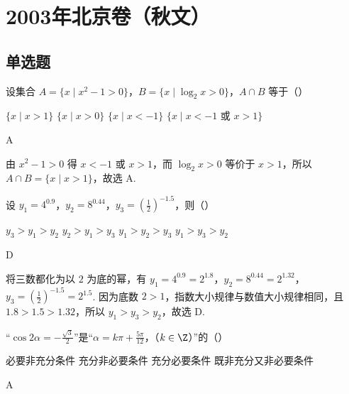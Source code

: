 \chapter{2003年北京卷（秋文）}
\section{单选题}
\begin{problem}
设集合 \(A = \{x \mid x^2 - 1 > 0\}\)，\(B = \{x \mid \log_2 x > 0\}\)，\(A \cap B\) 等于（\quad）

\choices
    {\(\{x \mid x > 1\}\)}
    {\(\{x \mid x > 0\}\)}
    {\(\{x \mid x < -1\}\)}
    {\(\{x \mid x < -1 \text{\ 或\ } x > 1\}\)}
\end{problem}

\begin{answer}
A
\end{answer}

\begin{solution}
由 \(x^2-1>0\) 得 \(x<-1\) 或 \(x>1\)，而 \(\log_2x>0\) 等价于 \(x>1\)，所以 \(A\cap B=\{x\mid x>1\}\)，故选 A.
\end{solution}

\begin{problem}
设 \(y_1 = 4^{0.9}\)，\(y_2 = 8^{0.44}\)，\(y_3 = \left(\frac{1}{2}\right)^{-1.5}\)，则（\quad）

\choices
    {\(y_3 > y_1 > y_2\)}
    {\(y_2 > y_1 > y_3\)}
    {\(y_1 > y_2 > y_3\)}
    {\(y_1 > y_3 > y_2\)}
\end{problem}

\begin{answer}
D
\end{answer}

\begin{solution}
将三数都化为以 \(2\) 为底的幂，有 \(y_1=4^{0.9}=2^{1.8}\)，\(y_2=8^{0.44}=2^{1.32}\)，\(y_3=(\frac{1}{2})^{-1.5}=2^{1.5}\). 因为底数 \(2>1\)，指数大小规律与数值大小规律相同，且 \(1.8>1.5>1.32\)，所以 \(y_1>y_3>y_2\)，故选 D.
\end{solution}

\begin{problem}
“\(\cos 2\alpha = -\frac{\sqrt{3}}{2}\)”是“\(\alpha = k\pi + \frac{5\pi}{12}\)，（\(k \in \Z\)）”的（\quad）

\choices
    {必要非充分条件}
    {充分非必要条件}
    {充分必要条件}
    {既非充分又非必要条件}
\end{problem}

\begin{answer}
A
\end{answer}

